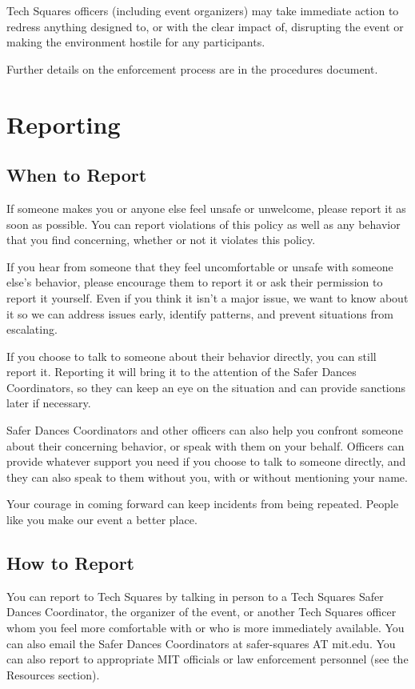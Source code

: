 \documentclass{article}
\begin{document}
Tech Squares officers (including event organizers) may take immediate action to redress anything designed to, or with the clear impact of, disrupting the event or making the environment hostile for any participants.

Further details on the enforcement process are in the procedures document.

\section{Reporting}

\subsection*{When to Report}

If someone makes you or anyone else feel unsafe or unwelcome, please report it as soon as possible. You can report violations of this policy as well as any behavior that you find concerning, whether or not it violates this policy.

If you hear from someone that they feel uncomfortable or unsafe with someone else’s behavior, please encourage them to report it or ask their permission to report it yourself. Even if you think it isn’t a major issue, we want to know about it so we can address issues early, identify patterns, and prevent situations from escalating.

If you choose to talk to someone about their behavior directly, you can still report it. Reporting it will bring it to the attention of the Safer Dances Coordinators, so they can keep an eye on the situation and can provide sanctions later if necessary. 

Safer Dances Coordinators and other officers can also help you confront someone about their concerning behavior, or speak with them on your behalf. Officers can provide whatever support you need if you choose to talk to someone directly, and they can also speak to them without you, with or without mentioning your name. 

Your courage in coming forward can keep incidents from being repeated. People like you make our event a better place.

\subsection*{How to Report}

You can report to Tech Squares by talking in person to a Tech Squares Safer Dances Coordinator, the organizer of the event, or another Tech Squares officer whom you feel more comfortable with or who is more immediately available. You can also email the Safer Dances Coordinators at safer-squares AT mit.edu. You can also report to appropriate MIT officials or law enforcement personnel (see the Resources section).
\end{document}
